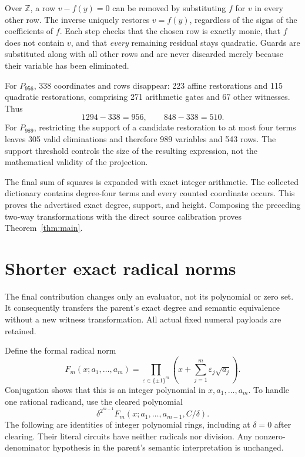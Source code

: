 \documentclass[11pt,letterpaper]{article}
\theoremstyle{definition}
\theoremstyle{remark}
\newcommand{\Z}{\mathbb Z}
\begin{document}
Over $\Z$, a row $v-f(y)=0$ can be removed by substituting $f$ for $v$
in every other row. The inverse uniquely restores $v=f(y)$, regardless
of the signs of the coefficients of $f$. Each step checks that the
chosen row is exactly monic, that $f$ does not contain $v$, and that
\emph{every} remaining residual stays quadratic. Guards are substituted
along with all other rows and are never discarded merely because
their variable has been eliminated.

For $P_{956}$, 338 coordinates and rows disappear: 223 affine
restorations and 115 quadratic restorations, comprising 271 arithmetic
gates and 67 other witnesses. Thus
\[
              1294-338=956,\qquad848-338=510.
\]
For $P_{989}$, restricting the support of a candidate restoration to at
most four terms leaves 305 valid eliminations and therefore 989 variables
and 543 rows. The support threshold controls the size of the resulting
expression, not the mathematical validity of the projection.

The final sum of squares is expanded with exact integer arithmetic.
The collected dictionary contains degree-four terms and every counted
coordinate occurs. This proves the advertised exact degree, support,
and height. Composing the preceding two-way transformations with the
direct source calibration proves Theorem~\ref{thm:main}.



\section{Shorter exact radical norms}
\label{sec:norms}

The final contribution changes only an evaluator, not its polynomial or
zero set. It consequently transfers the parent's exact degree and
semantic equivalence without a new witness transformation. All actual
fixed numeral payloads are retained.

Define the formal radical norm
\[
 F_m(x;a_1,\ldots,a_m)
  =\prod_{\varepsilon\in\{\pm1\}^m}
      \left(x+\sum_{j=1}^m\varepsilon_j\sqrt{a_j}\right).
\]
Conjugation shows that this is an integer polynomial in $x,a_1,\ldots,a_m$.
To handle one rational radicand, use the cleared polynomial
\[
 \delta^{2^{m-1}}
 F_m(x;a_1,\ldots,a_{m-1},C/\delta).
\]
The following are identities of integer polynomial rings, including at
$\delta=0$ after clearing. Their literal circuits have neither radicals
nor division. Any nonzero-denominator hypothesis in the parent's
semantic interpretation is unchanged.
\end{document}
